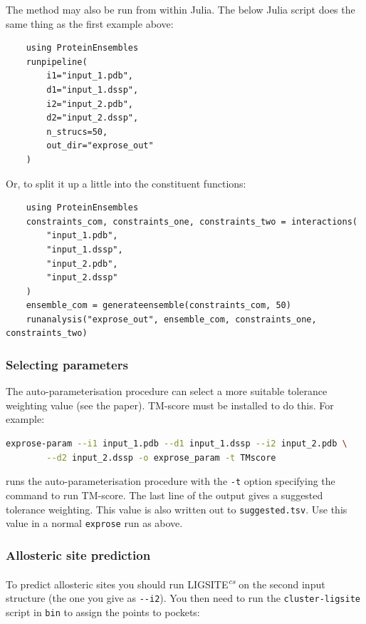 The method may also be run from within Julia. The below Julia script does the same thing as the first example above:

\begin{lstlisting}
    using ProteinEnsembles
    runpipeline(
        i1="input_1.pdb",
        d1="input_1.dssp",
        i2="input_2.pdb",
        d2="input_2.dssp",
        n_strucs=50,
        out_dir="exprose_out"
    )
\end{lstlisting}

Or, to split it up a little into the constituent functions:

\begin{lstlisting}
    using ProteinEnsembles
    constraints_com, constraints_one, constraints_two = interactions(
        "input_1.pdb",
        "input_1.dssp",
        "input_2.pdb",
        "input_2.dssp"
    )
    ensemble_com = generateensemble(constraints_com, 50)
    runanalysis("exprose_out", ensemble_com, constraints_one, constraints_two)
\end{lstlisting}


\subsubsection*{Selecting parameters}

The auto-parameterisation procedure can select a more suitable tolerance weighting value (see the paper). TM-score must be installed to do this. For example:

\begin{lstlisting}[language=bash]
    exprose-param --i1 input_1.pdb --d1 input_1.dssp --i2 input_2.pdb \
        --d2 input_2.dssp -o exprose_param -t TMscore
\end{lstlisting}

runs the auto-parameterisation procedure with the \verb|-t| option specifying the command to run TM-score. The last line of the output gives a suggested tolerance weighting. This value is also written out to \verb|suggested.tsv|. Use this value in a normal \verb|exprose| run as above.


\subsubsection*{Allosteric site prediction}

To predict allosteric sites you should run LIGSITE\textsuperscript{\it cs} on the second input structure (the one you give as \verb|--i2|). You then need to run the \verb|cluster-ligsite| script in \verb|bin| to assign the points to pockets:

